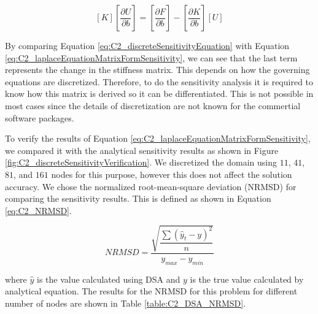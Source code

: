 \begin{equation}\label{eq:C2_discreteSensitivityEquation}
	\left[ K \right] \left[ \frac{\partial U}{\partial b} \right] = 
	\left[ \frac{\partial F}{\partial b} \right] - 
		\left[ \frac{\partial K}{\partial b} \right] \left[ U \right]
\end{equation}

By comparing Equation \eqref{eq:C2_discreteSensitivityEquation} with Equation \eqref{eq:C2_laplaceEquationMatrixFormSensitivity}, we can see that the last term represents the change in the stiffness matrix. This depends on how the governing equations are discretized. Therefore, to do the sensitivity analysis it is required to know how this matrix is derived so it can be differentiated. This is not possible in most cases since the details of discretization are not known for the commertial software packages.

To verify the results of Equation \eqref{eq:C2_laplaceEquationMatrixFormSensitivity}, we compared it with the analytical sensitivity results as shown in Figure \ref{fig:C2_discreteSensitivityVerification}. We discretized the domain using $11$, $41$, $81$, and $161$ nodes for this purpose, however this does not affect the solution accuracy. We chose the normalized root-mean-square deviation (NRMSD) for comparing the sensitivity results. This is defined as shown in Equation \eqref{eq:C2_NRMSD}.

\begin{equation}\label{eq:C2_NRMSD}
	NRMSD = \dfrac{\sqrt{\dfrac{\sum (\hat{y}_t - y)^2}{n}}}{y_{max} - y_{min}}
\end{equation}

where $\hat{y}$ is the value calculated using DSA and $y$ is the true value calculated by analytical equation. The results for the NRMSD for this problem for different number of nodes are shown in Table \ref{table:C2_DSA_NRMSD}.

